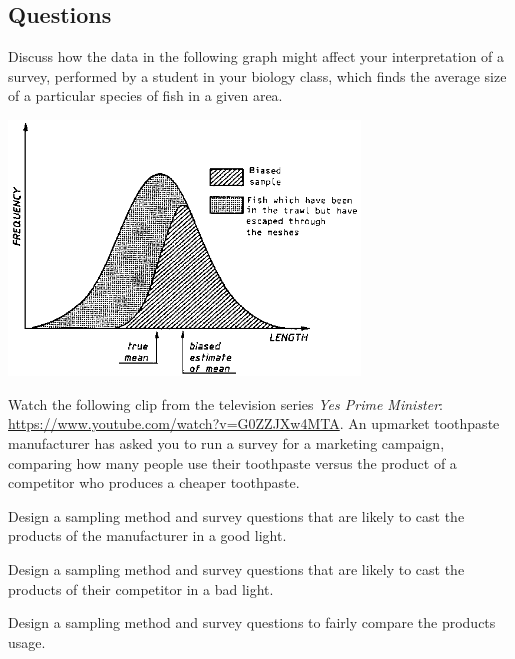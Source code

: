 \subsection*{Questions}
\begin{questions}
  \question Discuss how the data in the following graph might affect your interpretation of a survey, performed by a student in your biology class,
            which finds the average size of a particular species of fish in a given area.
            \begin{center}
              \includegraphics[width=0.7\textwidth]{badsample}
            \end{center}
  \question Watch the following clip from the television series \emph{Yes Prime Minister}: \url{https://www.youtube.com/watch?v=G0ZZJXw4MTA}.
            An upmarket toothpaste manufacturer has asked you to run a survey for a marketing campaign, comparing how many people use their
            toothpaste versus the product of a competitor who produces a cheaper toothpaste.
    \begin{parts}
      \item Design a sampling method and survey questions that are likely to cast the products of the manufacturer in a good light.
      \item Design a sampling method and survey questions that are likely to cast the products of their competitor in a bad light.
      \item Design a sampling method and survey questions to fairly compare the products usage.
    \end{parts}
\end{questions}

